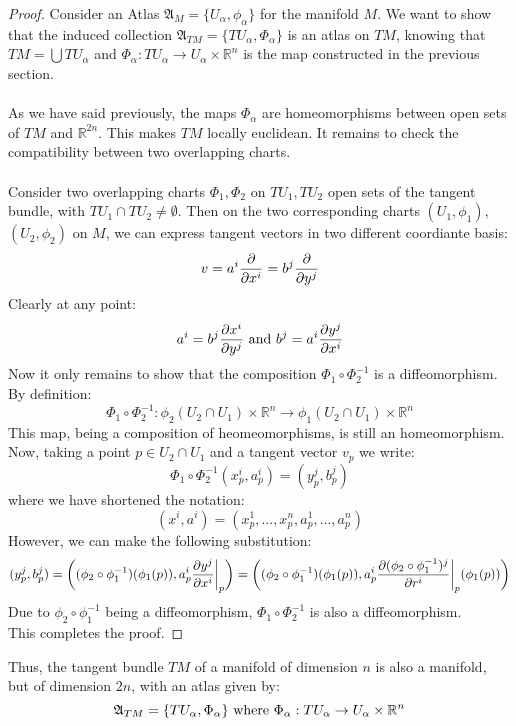 \documentclass[12pt,a4paper]{report}
\theoremstyle{definition}
\theoremstyle{Theorem}
\theoremstyle{definition}
\theoremstyle{definition}
\begin{document}
		\begin{proof}
			Consider an Atlas $\mathfrak{A}_M=\{U_\alpha,\phi_\alpha\}$ for the manifold $M$. We want to show that the induced collection $\mathfrak{A}_{TM}=\{TU_\alpha,\Phi_\alpha\}$ is an atlas on $TM$, knowing that $TM=\bigcup TU_\alpha$ and $\Phi_\alpha:TU_\alpha\rightarrow U_\alpha\times \mathbb{R}^n$ is the map constructed in the previous section.\\
			\\
			As we have said previously, the maps $\Phi_\alpha$ are homeomorphisms between open sets of $TM$ and $\mathbb{R}^{2n}$. This makes $TM$ locally euclidean. It remains to check the compatibility between two overlapping charts.\\
			\\
			Consider two overlapping charts $\Phi_1,\Phi_2$ on $TU_1,TU_2$ open sets of the tangent bundle, with $TU_1\cap TU_2\neq \emptyset$. Then on the two corresponding charts $(U_1,\phi_1)$, $(U_2,\phi_2)$ on $M$, we can express tangent vectors in two different coordiante basis:
			$$v=a^i{\partial\over \partial{x^i}}=b^j{\partial \over \partial y^j}$$
			Clearly at any point:
			$$a^i=b^j{\partial x^i\over\partial y^j} \hbox{ and } b^j=a^i{\partial y^j\over\partial x^i}$$
			Now it only remains to show that the composition $\Phi_1\circ \Phi_2^{-1}$ is a diffeomorphism.\\
			By definition:
			$$\Phi_1\circ \Phi_2^{-1}:\phi_2(U_2\cap U_1)\times \mathbb{R}^n\rightarrow \phi_1(U_2\cap U_1)\times \mathbb{R}^n$$
			This map, being a composition of heomeomorphisms, is still an homeomorphism. Now, taking a point $p\in U_2\cap U_1$ and a tangent vector $v_p$ we write:
			$$\Phi_1\circ \Phi_2^{-1}(x^i_p,a^i_p)=(y^j_p,b^j_p)$$
			where we have shortened the notation:
			$$(x^i,a^i)=(x^1_p,...,x^n_p,a^1_p,...,a^n_p)$$
			However, we can make the following substitution:
			$$(y^j_p,b^j_p)=\bigg((\phi_2\circ \phi_1^{-1})(\phi_1(p)),a^i_p{\partial y^j\over\partial x^i}\bigg|_p\bigg)=\bigg((\phi_2\circ \phi_1^{-1})(\phi_1(p)),a^i_p{\partial (\phi_2\circ \phi_1^{-1})^j\over\partial r^i}\bigg|_p(\phi_1(p))\bigg)$$
			Due to $\phi_2\circ \phi_1^{-1}$ being a diffeomorphism, $\Phi_1\circ \Phi_2^{-1}$ is also a diffeomorphism.\\
			This completes the proof.
		\end{proof}
		Thus, the tangent bundle $TM$ of a manifold of dimension $n$ is also a manifold, but of dimension $2n$, with an atlas given by:
		$$\mathfrak{A}_{TM}=\{TU_\alpha,\Phi_\alpha\} \hbox{ where } \Phi_\alpha:TU_\alpha\rightarrow U_\alpha\times \mathbb{R}^n$$
\end{document}
